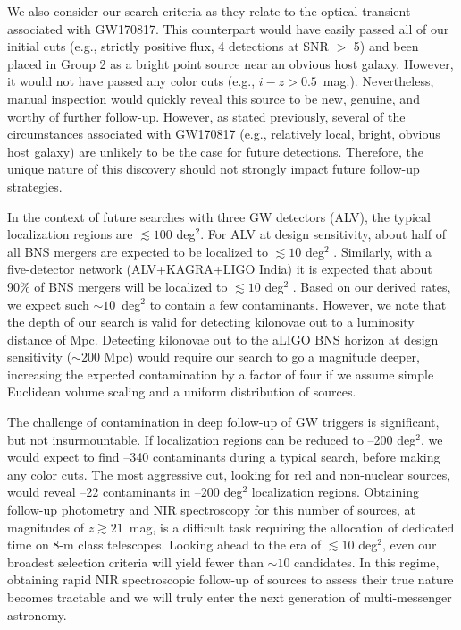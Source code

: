 We also consider our search criteria as they relate to the optical transient associated with GW170817. This counterpart would have easily passed all of our initial cuts (e.g., strictly positive flux, 4 detections at SNR $>$ 5) and been placed in Group 2 as a bright point source near an obvious host galaxy. However, it would not have passed any color cuts (e.g., $i-z > 0.5$~mag.). Nevertheless, manual inspection would quickly reveal this source to be new, genuine, and worthy of further follow-up. However, as stated previously, several of the circumstances associated with GW170817 (e.g., relatively local, bright, obvious host galaxy) are unlikely to be the case for future detections. Therefore, the unique nature of this discovery should not strongly impact future follow-up strategies.

In the context of future searches with three GW detectors (ALV), the typical localization regions are $\lesssim 100$ deg$^2$. For ALV at design sensitivity, about half of all BNS mergers are expected to be localized to $\lesssim10$ deg$^2$ \citep{ChenHolz16}. Similarly, with a five-detector network (ALV+KAGRA+LIGO India) it is expected that about 90\% of BNS mergers will be localized to $\lesssim 10$ deg$^2$ \citep{ChenHolz16}. Based on our derived rates, we expect such $\sim 10$~deg$^{2}$ to contain a few contaminants. However, we note that the depth of our search is valid for detecting kilonovae out to a luminosity distance of  Mpc. Detecting kilonovae out to the aLIGO BNS horizon at design sensitivity ($\sim200$ Mpc) would require our search to go a magnitude deeper, increasing the expected contamination by a factor of four if we assume simple Euclidean volume scaling and a uniform distribution of sources.

The challenge of contamination in deep follow-up of GW triggers is significant, but not insurmountable. If localization regions can be reduced to --200 deg$^2$, we would expect to find --340 contaminants during a typical search, before making any color cuts. The most aggressive cut, looking for red and non-nuclear sources, would reveal --22 contaminants in --200 deg$^2$ localization regions. Obtaining follow-up photometry and NIR spectroscopy for this number of sources, at magnitudes of $z \gtrsim 21$~mag, is a difficult task requiring the allocation of dedicated time on 8-m class telescopes. Looking ahead to the era of $\lesssim 10$ deg$^2$, even our broadest selection criteria will yield fewer than $\sim 10$ candidates. In this regime, obtaining rapid NIR spectroscopic follow-up of sources to assess their true nature becomes tractable and we will truly enter the next generation of multi-messenger astronomy.

